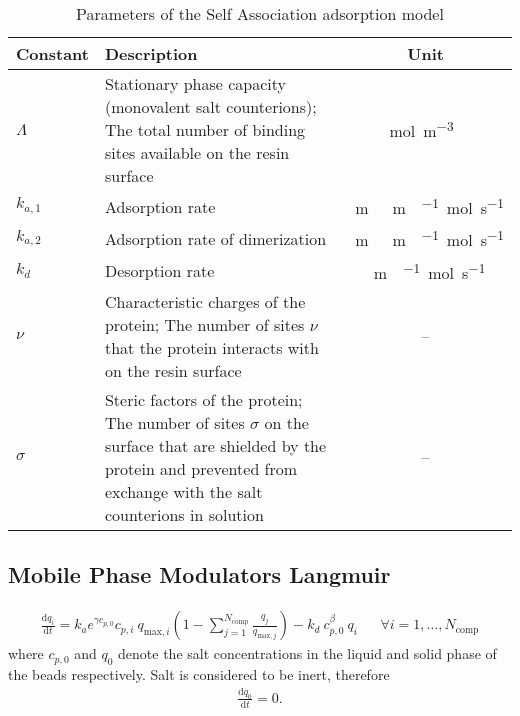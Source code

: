 \begin{table}[!ht]
  \footnotesize
  \begin{tabu}to \linewidth[m]{lX[m]c}
    \toprule
      \textbf{Constant} & \textbf{Description} & \textbf{Unit} \\
    \midrule
      $\Lambda$ & Stationary phase capacity (monovalent salt counterions); The total number of binding sites available on the resin surface & \si{\mol\per\cubic\metre{}} \\ \midrule
      $k_{a,1}$ & Adsorption rate & \si{\metre{}\metre{}\per{}\mol\per\second} \\ \midrule
      $k_{a,2}$ & Adsorption rate of dimerization & \si{\metre{}\metre{}\per{}\mol\per\second} \\ \midrule
      $k_d$ & Desorption rate & \si{\metre{}\per{}\mol\per\second} \\ \midrule
      $\nu$ & Characteristic charges of the protein; The number of sites $\nu$ that the protein interacts with on the resin surface & -- \\ \midrule
      $\sigma$ & Steric factors of the protein; The number of sites $\sigma$ on the surface that are shielded by the protein and prevented from exchange with the salt counterions in solution & -- \\
    \bottomrule
  \end{tabu}
  \caption{Parameters of the Self Association adsorption model}
\end{table}

\subsection{Mobile Phase Modulators Langmuir}

\begin{align*}
  \frac{\mathrm{d} q_i}{\mathrm{d} t} = k_a e^{\gamma c_{p,0}} c_{p,i}\: q_{\text{max},i} \left( 1 - \sum_{j=1}^{N_{\text{comp}}} \frac{q_j}{q_{\text{max},j}} \right) - k_d \: c_{p,0}^\beta \: q_i && \forall i = 1, \dots, N_{\text{comp}}
\end{align*}
where $c_{p,0}$ and $q_0$ denote the salt concentrations in the liquid and solid phase of the beads respectively. Salt is considered to be inert, therefore
\begin{align*}
  \frac{\mathrm{d} q_0}{\mathrm{d} t} = 0.
\end{align*}

